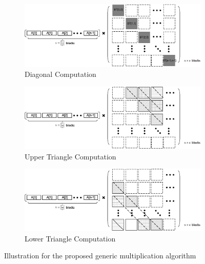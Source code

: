 \documentclass[runningheads]{llncs}
\begin{document}
\begin{figure}[!tb]
\centering
\begin{subfigure}[t]{0.47\textwidth}\centering
\includegraphics[width=\textwidth]{./fig/generic_mul_illustrate.eps}
\caption{Diagonal Computation}
\label{fig:gmul_ill1}
\end{subfigure}
\hspace{1em}
\begin{subfigure}[t]{0.47\textwidth}\centering
\includegraphics[width=\textwidth]{./fig/generic_mul_illustrate2.eps}
\caption{Upper Triangle Computation}
\label{fig:gmul_ill2}
\end{subfigure}
\hspace{1em}
\begin{subfigure}[t]{0.47\textwidth}\centering
\includegraphics[width=\textwidth]{./fig/generic_mul_illustrate3.eps}
\caption{Lower Triangle Computation}
\label{fig:gmul_ill3}
\end{subfigure}
\caption{Illustration for the proposed generic multiplication algorithm}
\end{figure}
\end{document}
